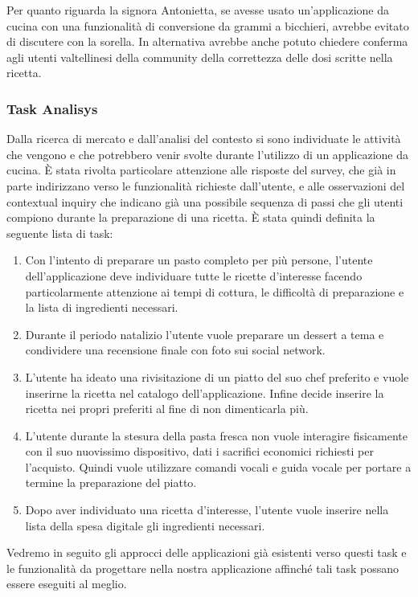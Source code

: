 Per quanto riguarda la signora Antonietta, se avesse usato un'applicazione 
da cucina con una funzionalità di conversione da grammi a
bicchieri, avrebbe evitato di discutere con la sorella. In
alternativa avrebbe anche potuto chiedere conferma agli
utenti valtellinesi della community della correttezza delle dosi scritte
nella ricetta.

\subsubsection{Task Analisys}
Dalla ricerca di mercato e dall'analisi del contesto si sono individuate
le attività che vengono e che potrebbero venir svolte durante l'utilizzo
di un applicazione da cucina. È stata rivolta particolare attenzione
alle risposte del survey, che già in parte indirizzano verso le
funzionalità richieste dall'utente, e alle osservazioni del contextual
inquiry che indicano già una possibile sequenza di passi che gli utenti
compiono durante la preparazione di una ricetta.
È stata quindi definita la seguente lista di task:
\begin{enumerate}
\label{tasks}
\item Con l'intento di preparare un pasto completo per più persone,
l'utente dell'applicazione deve individuare tutte le ricette d'interesse
facendo particolarmente attenzione ai tempi di cottura, le difficoltà di
preparazione e la lista di ingredienti necessari.
\item Durante il periodo natalizio l'utente vuole preparare un dessert a tema
e condividere una recensione finale con foto sui social network.
\item L'utente ha ideato una rivisitazione di un piatto del suo chef
preferito e vuole inserirne la ricetta nel catalogo dell'applicazione.
Infine decide inserire la ricetta nei propri preferiti al fine di non
dimenticarla più.
\item L'utente durante la stesura della pasta fresca non vuole
interagire fisicamente con il suo nuovissimo dispositivo, dati i
sacrifici economici richiesti per l'acquisto. Quindi vuole utilizzare
comandi vocali e guida vocale  per portare a termine la preparazione del
piatto.
\item Dopo aver individuato una ricetta d'interesse, l'utente vuole
inserire nella lista della spesa digitale gli ingredienti necessari.
\end{enumerate}

Vedremo in seguito gli approcci delle applicazioni già esistenti verso
questi task e le funzionalità da progettare nella nostra applicazione
affinché tali task possano essere eseguiti al meglio.
